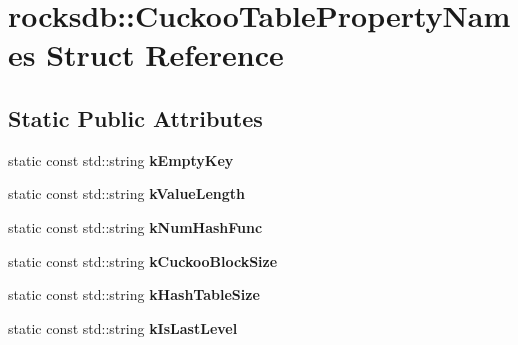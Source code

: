 \hypertarget{structrocksdb_1_1CuckooTablePropertyNames}{}\section{rocksdb\+:\+:Cuckoo\+Table\+Property\+Names Struct Reference}
\label{structrocksdb_1_1CuckooTablePropertyNames}
\subsection*{Static Public Attributes}
\begin{DoxyCompactItemize}
\item 
static const std\+::string {\bfseries k\+Empty\+Key}\hypertarget{structrocksdb_1_1CuckooTablePropertyNames_ad2cd11615e713336c1ba656f71f2556e}{}\label{structrocksdb_1_1CuckooTablePropertyNames_ad2cd11615e713336c1ba656f71f2556e}

\item 
static const std\+::string {\bfseries k\+Value\+Length}\hypertarget{structrocksdb_1_1CuckooTablePropertyNames_a93f7e4b524dc04816b44c3f4944e64c8}{}\label{structrocksdb_1_1CuckooTablePropertyNames_a93f7e4b524dc04816b44c3f4944e64c8}

\item 
static const std\+::string {\bfseries k\+Num\+Hash\+Func}\hypertarget{structrocksdb_1_1CuckooTablePropertyNames_aa69b4578d7983c3ab2552a7f9d2799ec}{}\label{structrocksdb_1_1CuckooTablePropertyNames_aa69b4578d7983c3ab2552a7f9d2799ec}

\item 
static const std\+::string {\bfseries k\+Cuckoo\+Block\+Size}\hypertarget{structrocksdb_1_1CuckooTablePropertyNames_ace537633de4c4d5bf9da30b275b3389e}{}\label{structrocksdb_1_1CuckooTablePropertyNames_ace537633de4c4d5bf9da30b275b3389e}

\item 
static const std\+::string {\bfseries k\+Hash\+Table\+Size}\hypertarget{structrocksdb_1_1CuckooTablePropertyNames_ae0707146bab108f6dd308342da9e5f6d}{}\label{structrocksdb_1_1CuckooTablePropertyNames_ae0707146bab108f6dd308342da9e5f6d}

\item 
static const std\+::string {\bfseries k\+Is\+Last\+Level}\hypertarget{structrocksdb_1_1CuckooTablePropertyNames_ad03ecf81daaeef52a6a3e09b62f8f59e}{}\label{structrocksdb_1_1CuckooTablePropertyNames_ad03ecf81daaeef52a6a3e09b62f8f59e}


\end{DoxyCompactItemize}
